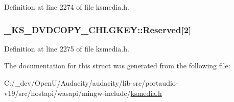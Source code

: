 Definition at line 2274 of file ksmedia.\+h.

\subsubsection[{\texorpdfstring{Reserved}{Reserved}}]{ \+\_\+\+K\+S\+\_\+\+D\+V\+D\+C\+O\+P\+Y\+\_\+\+C\+H\+L\+G\+K\+E\+Y\+::\+Reserved\mbox{[}2\mbox{]}}\hypertarget{struct___k_s___d_v_d_c_o_p_y___c_h_l_g_k_e_y_a7b2d5739ced0b96b64c928e568d937f1}{}\label{struct___k_s___d_v_d_c_o_p_y___c_h_l_g_k_e_y_a7b2d5739ced0b96b64c928e568d937f1}


Definition at line 2275 of file ksmedia.\+h.



The documentation for this struct was generated from the following file\+:\begin{DoxyCompactItemize}
\item 
C\+:/\+\_\+dev/\+Open\+U/\+Audacity/audacity/lib-\/src/portaudio-\/v19/src/hostapi/wasapi/mingw-\/include/\hyperlink{ksmedia_8h}{ksmedia.\+h}\end{DoxyCompactItemize}
